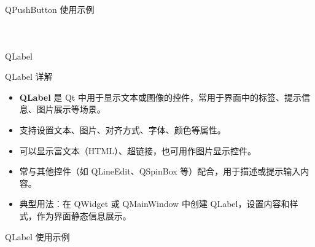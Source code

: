 \documentclass[UTF8,aspectratio=169]{beamer}
\begin{document}
\begin{frame}[fragile]{QPushButton 使用示例}
    \begin{columns}
        \begin{column}{0.48\textwidth}
            \inputminted[firstline=1,lastline=17]{cpp}{code/qt_pushbutton_example.cpp}
        \end{column}
        \begin{column}{0.48\textwidth}
            \inputminted[firstline=18,lastline=34]{cpp}{code/qt_pushbutton_example.cpp}
        \end{column}
    \end{columns}
\end{frame}

\begin{frame}{QLabel}
    \begin{ytublock}{QLabel 详解}
        \begin{itemize}
            \item \textbf{QLabel} 是 Qt 中用于显示文本或图像的控件，常用于界面中的标签、提示信息、图片展示等场景。
            \item 支持设置文本、图片、对齐方式、字体、颜色等属性。
            \item 可以显示富文本（HTML）、超链接，也可用作图片显示控件。
            \item 常与其他控件（如 QLineEdit、QSpinBox 等）配合，用于描述或提示输入内容。
            \item 典型用法：在 QWidget 或 QMainWindow 中创建 QLabel，设置内容和样式，作为界面静态信息展示。
        \end{itemize}
    \end{ytublock}
\end{frame}

\begin{frame}[fragile]{QLabel 使用示例}
    \begin{columns}
        \begin{column}{0.48\textwidth}
            \inputminted[firstline=1,lastline=15]{cpp}{code/qt_label_example.cpp}
        \end{column}
        \begin{column}{0.48\textwidth}
            \inputminted[firstline=16,lastline=30]{cpp}{code/qt_label_example.cpp}
        \end{column}
    \end{columns}
\end{frame}
\end{document}
